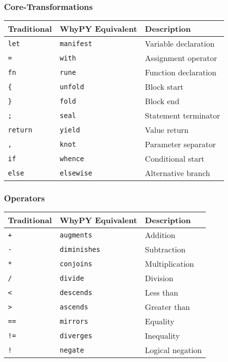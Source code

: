 \documentclass[11pt]{article}
\begin{document}
\subsubsection{Core-Transformations}
\begin{tcolorbox}[
    colback=white,
    colframe=primary,
    arc=0pt,
    title={\color{white}\colorbox{primary}{\hspace{\textwidth}\llap{\textbf{Core Language Transformations}}}},
    top=0pt
]
\begin{tabular}{|l|l|l|}
\hline
\rowcolor{primary!20}\textbf{Traditional} & \textbf{WhyPY Equivalent} & \textbf{Description} \\
\hline
\texttt{let} & \texttt{manifest} & Variable declaration \\
\texttt{=} & \texttt{with} & Assignment operator \\
\texttt{fn} & \texttt{rune} & Function declaration \\
\texttt{\{} & \texttt{unfold} & Block start \\
\texttt{\}} & \texttt{fold} & Block end \\
\texttt{;} & \texttt{seal} & Statement terminator \\
\texttt{return} & \texttt{yield} & Value return \\
\texttt{,} & \texttt{knot} & Parameter separator \\
\texttt{if} & \texttt{whence} & Conditional start \\
\texttt{else} & \texttt{elsewise} & Alternative branch \\
\hline
\end{tabular}
\end{tcolorbox}

\subsubsection{Operators}
\begin{tcolorbox}[
    colback=white,
    colframe=primary,
    arc=0pt,
    title={\color{white}\colorbox{primary}{\hspace{\textwidth}\llap{\textbf{Operator Mappings}}}},
    top=0pt
]
\begin{tabular}{|l|l|l|}
\hline
\rowcolor{primary!20}\textbf{Traditional} & \textbf{WhyPY Equivalent} & \textbf{Description} \\
\hline
\texttt{+} & \texttt{augments} & Addition \\
\texttt{-} & \texttt{diminishes} & Subtraction \\
\texttt{*} & \texttt{conjoins} & Multiplication \\
\texttt{/} & \texttt{divide} & Division \\
\texttt{<} & \texttt{descends} & Less than \\
\texttt{>} & \texttt{ascends} & Greater than \\
\texttt{==} & \texttt{mirrors} & Equality \\
\texttt{!=} & \texttt{diverges} & Inequality \\
\texttt{!} & \texttt{negate} & Logical negation \\
\hline
\end{tabular}
\end{tcolorbox}
\end{document}
